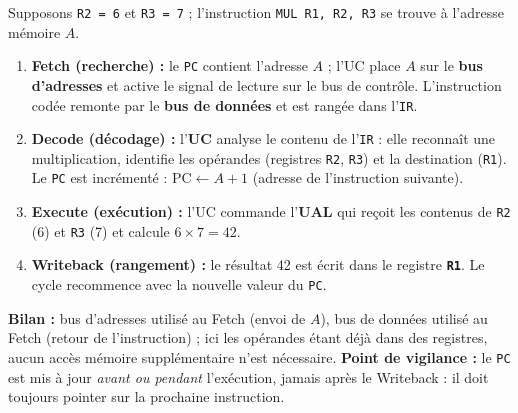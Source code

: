 \documentclass[11pt]{article}
\begin{document}
\begin{corrige}
Supposons \texttt{R2 = 6} et \texttt{R3 = 7} ; l'instruction \texttt{MUL R1, R2, R3} se trouve à l'adresse mémoire $A$.
\begin{enumerate}
    \item \textbf{Fetch (recherche) :} le \texttt{PC} contient l'adresse $A$ ; l'UC place $A$ sur le \textbf{bus d'adresses} et active le signal de lecture sur le bus de contrôle. L'instruction codée remonte par le \textbf{bus de données} et est rangée dans l'\texttt{IR}.
    \item \textbf{Decode (décodage) :} l'\textbf{UC} analyse le contenu de l'\texttt{IR} : elle reconnaît une multiplication, identifie les opérandes (registres \texttt{R2}, \texttt{R3}) et la destination (\texttt{R1}). Le \texttt{PC} est incrémenté : $\text{PC} \leftarrow A + 1$ (adresse de l'instruction suivante).
    \item \textbf{Execute (exécution) :} l'UC commande l'\textbf{UAL} qui reçoit les contenus de \texttt{R2} (6) et \texttt{R3} (7) et calcule $6 \times 7 = 42$.
    \item \textbf{Writeback (rangement) :} le résultat 42 est écrit dans le registre \textbf{\texttt{R1}}. Le cycle recommence avec la nouvelle valeur du \texttt{PC}.
\end{enumerate}
\textbf{Bilan :} bus d'adresses utilisé au Fetch (envoi de $A$), bus de données utilisé au Fetch (retour de l'instruction) ; ici les opérandes étant déjà dans des registres, aucun accès mémoire supplémentaire n'est nécessaire.
\textbf{Point de vigilance :} le \texttt{PC} est mis à jour \emph{avant ou pendant} l'exécution, jamais après le Writeback : il doit toujours pointer sur la prochaine instruction.
\end{corrige}
\end{document}
